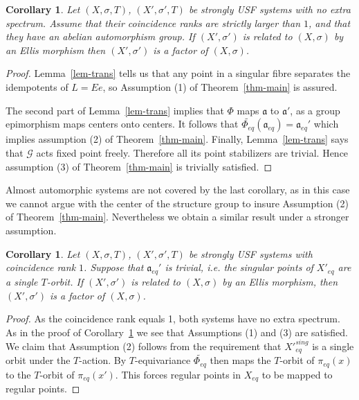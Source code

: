 \documentclass[12pt]{amsart}
\newtheorem{cor}[theorem]{Corollary}
\theoremstyle{definition}
\numberwithin{equation}{section}
\newcommand{\Gg}{{\mathcal G}}
\newcommand{\Xe}{X_{eq}}
\newcommand{\aut}{{\mathfrak a}}
\newcommand{\aute}{\aut_{eq}}
\newcommand{\pe}{\pi_{eq}}
\newcommand{\tPhe}{\widetilde{\Phi_{eq}}}
\begin{document}
\begin{cor}\label{cor:fcr}
Let $(X,\sigma,T)$, $(X',\sigma',T)$ be  strongly USF systems with no extra spectrum.
Assume that their coincidence ranks are  strictly larger than $1$, and that they have an abelian automorphism group. If $(X',\sigma')$ is related to  $(X,\sigma)$ by an Ellis morphism then 
$(X',\sigma')$ is a factor of $(X,\sigma)$.
\end{cor}
\begin{proof}
Lemma~\ref{lem-trans} tells us that  any point in a  singular fibre separates the idempotents of $L=Ee$, so 
Assumption (1) of Theorem~\ref{thm-main} is assured.
  
The second part of  Lemma~\ref{lem-trans} implies that $\Phi$ maps $\aut$ to $\aut'$, as a group epimorphism maps centers onto centers. It follows that $\tPhe(\aute)=\aute'$ which implies assumption (2) of Theorem~\ref{thm-main}. 
Finally, Lemma~\ref{lem-trans} says that $\Gg$ acts fixed point freely. Therefore all its point stabilizers are trivial. Hence  assumption (3) of Theorem~\ref{thm-main} is trivially satisfied.
\end{proof}
Almost automorphic systems are not covered by the last corollary, as in this case we cannot argue with the center of the structure group to insure Assumption (2) of Theorem~\ref{thm-main}. Nevertheless we obtain a similar result under a stronger assumption.
\begin{cor}\label{cor:cr1}
Let $(X,\sigma,T)$, $(X',\sigma',T)$ be  strongly USF systems with coincidence rank $1$. 
 Suppose that  $\aute'$ is trivial, i.e. the singular points of $X'_{eq}$ are a single $T$-orbit. 
If $(X',\sigma')$ is related to $(X,\sigma)$ by an Ellis morphism, then $(X',\sigma')$ is a factor of $(X,\sigma)$.
\end{cor}
\begin{proof}
As the coincidence rank equals 1, both systems have no extra spectrum.  As in the proof of Corollary~\ref{cor:fcr} we see that Assumptions (1) and (3) are satisfied. 
 We claim that Assumption (2) follows from the requirement that  
${X'}_{eq}^{sing}$ is a single orbit under the $T$-action. By $T$-equivariance $\tPhe $ then maps the $T$-orbit of $\pe(x)$ to the $T$-orbit of $\pe(x')$. This forces regular points in $\Xe$ to be mapped to regular points. \end{proof}
\end{document}
